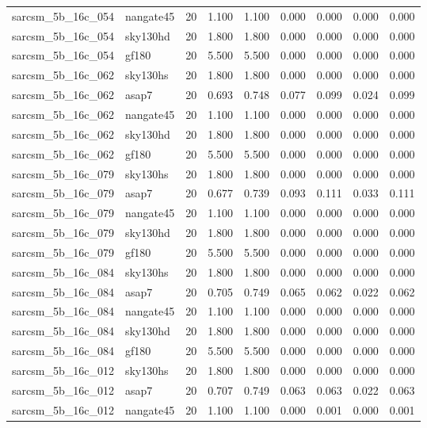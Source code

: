 \begin{tabular}{llrrrrrrr}
sarcsm\_5b\_16c\_054 & nangate45 & 20 & 1.100 & 1.100 & 0.000 & 0.000 & 0.000 & 0.000 \\
sarcsm\_5b\_16c\_054 & sky130hd & 20 & 1.800 & 1.800 & 0.000 & 0.000 & 0.000 & 0.000 \\
sarcsm\_5b\_16c\_054 & gf180 & 20 & 5.500 & 5.500 & 0.000 & 0.000 & 0.000 & 0.000 \\
sarcsm\_5b\_16c\_062 & sky130hs & 20 & 1.800 & 1.800 & 0.000 & 0.000 & 0.000 & 0.000 \\
sarcsm\_5b\_16c\_062 & asap7 & 20 & 0.693 & 0.748 & 0.077 & 0.099 & 0.024 & 0.099 \\
sarcsm\_5b\_16c\_062 & nangate45 & 20 & 1.100 & 1.100 & 0.000 & 0.000 & 0.000 & 0.000 \\
sarcsm\_5b\_16c\_062 & sky130hd & 20 & 1.800 & 1.800 & 0.000 & 0.000 & 0.000 & 0.000 \\
sarcsm\_5b\_16c\_062 & gf180 & 20 & 5.500 & 5.500 & 0.000 & 0.000 & 0.000 & 0.000 \\
sarcsm\_5b\_16c\_079 & sky130hs & 20 & 1.800 & 1.800 & 0.000 & 0.000 & 0.000 & 0.000 \\
sarcsm\_5b\_16c\_079 & asap7 & 20 & 0.677 & 0.739 & 0.093 & 0.111 & 0.033 & 0.111 \\
sarcsm\_5b\_16c\_079 & nangate45 & 20 & 1.100 & 1.100 & 0.000 & 0.000 & 0.000 & 0.000 \\
sarcsm\_5b\_16c\_079 & sky130hd & 20 & 1.800 & 1.800 & 0.000 & 0.000 & 0.000 & 0.000 \\
sarcsm\_5b\_16c\_079 & gf180 & 20 & 5.500 & 5.500 & 0.000 & 0.000 & 0.000 & 0.000 \\
sarcsm\_5b\_16c\_084 & sky130hs & 20 & 1.800 & 1.800 & 0.000 & 0.000 & 0.000 & 0.000 \\
sarcsm\_5b\_16c\_084 & asap7 & 20 & 0.705 & 0.749 & 0.065 & 0.062 & 0.022 & 0.062 \\
sarcsm\_5b\_16c\_084 & nangate45 & 20 & 1.100 & 1.100 & 0.000 & 0.000 & 0.000 & 0.000 \\
sarcsm\_5b\_16c\_084 & sky130hd & 20 & 1.800 & 1.800 & 0.000 & 0.000 & 0.000 & 0.000 \\
sarcsm\_5b\_16c\_084 & gf180 & 20 & 5.500 & 5.500 & 0.000 & 0.000 & 0.000 & 0.000 \\
sarcsm\_5b\_16c\_012 & sky130hs & 20 & 1.800 & 1.800 & 0.000 & 0.000 & 0.000 & 0.000 \\
sarcsm\_5b\_16c\_012 & asap7 & 20 & 0.707 & 0.749 & 0.063 & 0.063 & 0.022 & 0.063 \\
sarcsm\_5b\_16c\_012 & nangate45 & 20 & 1.100 & 1.100 & 0.000 & 0.001 & 0.000 & 0.001 \\

\end{tabular}
